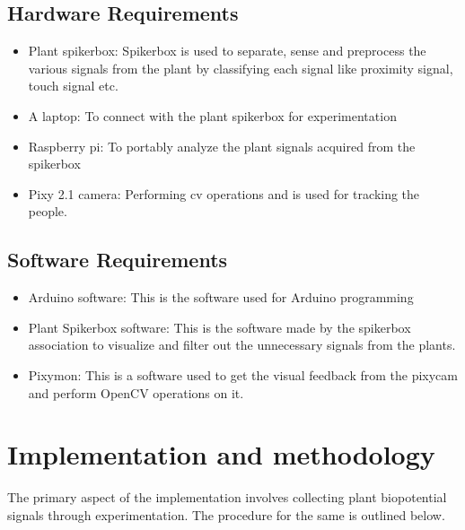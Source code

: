 \documentclass[conference]{IEEEtran}
\begin{document}
   \subsection{Hardware Requirements}
    \begin{itemize}
        \item Plant spikerbox: Spikerbox is used to separate, sense and preprocess the various signals from the plant by classifying each signal like proximity signal, touch signal etc.
        \item A laptop: To connect with the plant spikerbox for experimentation 
        \item Raspberry pi: To portably analyze the plant signals acquired from the spikerbox
        \item Pixy 2.1 camera: Performing cv operations and is used for tracking the people.
    \end{itemize} 

   \subsection{Software Requirements}
    \begin{itemize}
        \item Arduino software: This is the software used for Arduino programming
        \item Plant Spikerbox software: This is the software made by the spikerbox association to visualize and filter out the unnecessary signals from the plants.
        \item Pixymon: This is a software used to get the visual feedback from the pixycam and perform OpenCV operations on it.
    \end{itemize}

\section{Implementation and methodology} 

    The primary aspect of the implementation involves collecting plant
    biopotential signals through experimentation. The procedure for
    the same is outlined below.
\end{document}
